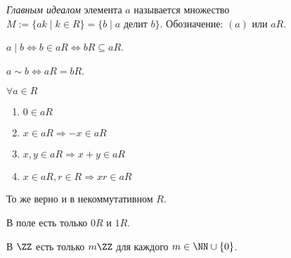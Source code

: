 \documentclass[12pt,a4paper]{article}
\begin{document}
    \begin{definition}
        \emph{Главным идеалом} элемента $a$ называется множество $M := \{ak \mid k \in R\} = \{b \mid a \text{ делит } b\}$. Обозначение: $(a)$ или $aR$.
    \end{definition}

    \begin{statement}
        $a \mid b \Leftrightarrow b \in aR \Leftrightarrow bR \subseteq aR$. 
    \end{statement}

    \begin{statement}
        $a \sim b \Leftrightarrow aR = bR$.
    \end{statement}

    \begin{statement}$\forall a \in R$
        \begin{enumerate}
            \item $0 \in aR$
            \item $x \in aR \Rightarrow -x \in aR$
            \item $x, y \in aR \Rightarrow x + y \in aR$
            \item $x \in aR, r \in R \Rightarrow xr \in aR$
        \end{enumerate}
    \end{statement}

    \begin{remark}
        То же верно и в некоммутативном $R$.
    \end{remark}

    \begin{example}
        В поле есть только $0R$ и $1R$.
    \end{example}

    \begin{example}
        В $\ZZ$ есть только $m\ZZ$ для каждого $m \in \NN \cup \{0\}$.
    \end{example}
\end{document}
